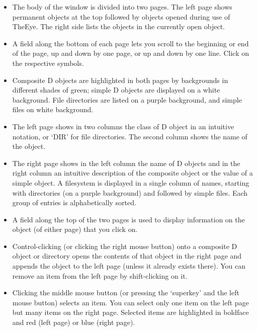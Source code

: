 \begin{description}
\begin{itemize}
\item The body of the window is divided into two pages. The left page shows permanent objects at the top followed by objects opened during use of TheEye. The right side lists the objects in the currently open object.

\item A field along the bottom of each page lets you scroll to the beginning or end of the page, up and down by one page, or up and down by one line. Click on the respective symbols.

\item Composite D objects are highlighted in both pages by backgrounds in different shades of green; simple D objects are displayed on a white background. File directories are listed on a purple background, and simple files on white background.

\item The left page shows in two columns the class of D object in an intuitive notation, or `DIR' for file directories. The second column shows the name of the object.

\item The right page shows in the left column the name of D objects and in the right column an intuitive description of the composite object or the value of a simple object. A filesystem is displayed in a single column of names, starting with directories (on a purple background) and followed by simple files. Each group of entries is alphabetically sorted.

\item A field along the top of the two pages is used to display information on the object (of either page) that you click on.

\item Control-clicking (or clicking the right mouse button) onto a composite D object or directory opens the contents of that object in the right page and appends the object to the left page (unless it already exists there). You can remove an item from the left page by shift-clicking on it.

\item Clicking the middle mouse button (or pressing the `superkey' and the left mouse button) selects an item. You can select only one item on the left page but many items on the right page. Selected items are highlighted in boldface and red (left page) or blue (right page).
\end{itemize}


\end{description}
